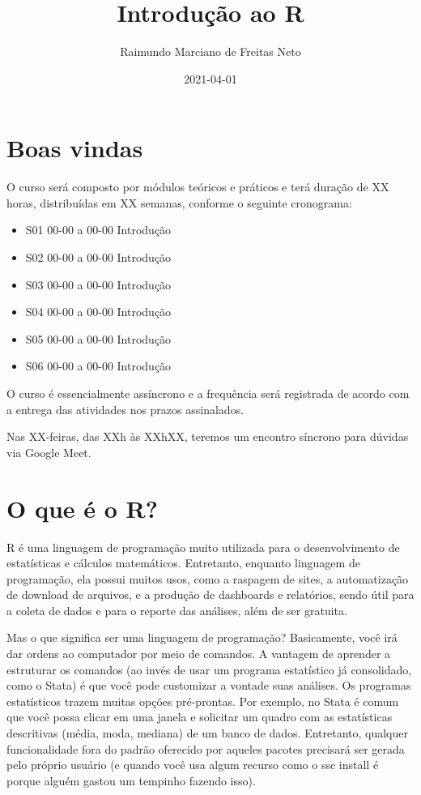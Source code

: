 \documentclass[
]{book}
\title{Introdução ao R}
\author{Raimundo Marciano de Freitas Neto}
\date{2021-04-01}
\providecommand{\tightlist}{%
  \setlength{\itemsep}{0pt}\setlength{\parskip}{0pt}}
\begin{document}
\maketitle

{
\setcounter{tocdepth}{1}
\tableofcontents
}
\hypertarget{boas-vindas}{%
\chapter{Boas vindas}\label{boas-vindas}}

O curso será composto por módulos teóricos e práticos e terá duração de XX horas, distribuídas em XX semanas, conforme o seguinte cronograma:

\begin{itemize}
\tightlist
\item
  S01 00-00 a 00-00 Introdução
\item
  S02 00-00 a 00-00 Introdução
\item
  S03 00-00 a 00-00 Introdução
\item
  S04 00-00 a 00-00 Introdução
\item
  S05 00-00 a 00-00 Introdução
\item
  S06 00-00 a 00-00 Introdução
\end{itemize}

O curso é essencialmente assíncrono e a frequência será registrada de acordo com a entrega das atividades nos prazos assinalados.

Nas XX-feiras, das XXh às XXhXX, teremos um encontro síncrono para dúvidas via Google Meet.

\hypertarget{intro}{%
\chapter{O que é o R?}\label{intro}}

R é uma linguagem de programação muito utilizada para o desenvolvimento de estatísticas e cálculos matemáticos. Entretanto, enquanto linguagem de programação, ela possui muitos usos, como a raspagem de sites, a automatização de download de arquivos, e a produção de dashboards e relatórios, sendo útil para a coleta de dados e para o reporte das análises, além de ser gratuita.

Mas o que significa ser uma linguagem de programação? Basicamente, você irá dar ordens ao computador por meio de comandos. A vantagem de aprender a estruturar os comandos (ao invés de usar um programa estatístico já consolidado, como o Stata) é que você pode customizar a vontade suas análises. Os programas estatísticos trazem muitas opções pré-prontas. Por exemplo, no Stata é comum que você possa clicar em uma janela e solicitar um quadro com as estatísticas descritivas (média, moda, mediana) de um banco de dados. Entretanto, qualquer funcionalidade fora do padrão oferecido por aqueles pacotes precisará ser gerada pelo próprio usuário (e quando você usa algum recurso como o ssc install é porque alguém gastou um tempinho fazendo isso).
\end{document}
